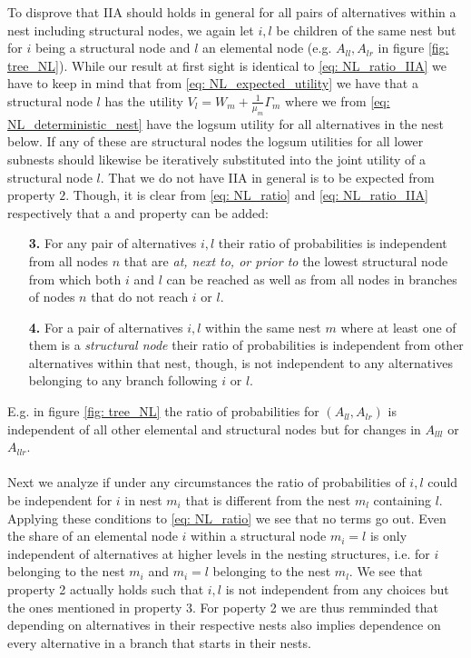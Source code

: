 To disprove that IIA should holds in general for all pairs of alternatives within a nest including structural nodes, we again let $i,l$ be children of the same nest but for $i$ being a structural node and $l$ an elemental node (e.g. $A_{ll},A_{lr}$ in figure \ref{fig: tree_NL}). While our result at first sight is identical to \eqref{eq: NL_ratio_IIA} we have to keep in mind that from \eqref{eq: NL_expected_utility} we have that a structural node $l$ has the utility $V_l=W_m+\frac{1}{\mu_m}\Gamma_{m}$
where we from \eqref{eq: NL_deterministic_nest} have the logsum utility  for all alternatives in the nest below. If any of these are structural nodes the logsum utilities for all lower subnests should likewise be iteratively substituted into the joint utility of a structural node $l$. That we do not have IIA in general is to be expected from property $2$. Though, it is clear from \eqref{eq: NL_ratio} and \eqref{eq: NL_ratio_IIA} respectively that a  and  property can be added:
\begin{itemize}
  \item[\textbf{3.}] For any pair of alternatives $i,l$ their ratio of probabilities is independent from all nodes $n$ that are \textit{at, next to, or prior to} the lowest structural node from which both $i$ and $l$ can be reached as well as from all nodes in branches of nodes $n$ that do not reach $i$ or $l$.
  \item[\textbf{4.}] For a pair of alternatives $i,l$ within the same nest $m$ where at least one of them is a \textit{structural node} their ratio of probabilities is independent from other alternatives within that nest, though, is not independent to any alternatives belonging to any branch following $i$ or $l$.
\end{itemize}
E.g. in figure \ref{fig: tree_NL} the ratio of probabilities for $(A_{ll},A_{lr})$ is independent of all other elemental and structural nodes but for changes in $A_{lll}$ or $A_{llr}$.
\\ \\
Next we analyze if under any circumstances the ratio of probabilities of $i,l$ could be independent for $i$ in nest $m_i$ that is different from the nest $m_l$ containing $l$. Applying these conditions to \eqref{eq: NL_ratio} we see that no terms go out. Even the share of an elemental node $i$ within a structural node $m_i=l$ is only independent of alternatives at higher levels in the nesting structures, i.e. for $i$ belonging to the nest $m_i$ and $m_i=l$ belonging to the nest $m_l$. We see that property 2 actually holds such that $i,l$ is not independent from any choices but the ones mentioned in property 3. For poperty 2 we are thus remminded that depending on alternatives in their respective nests also implies dependence on every alternative in a branch that starts in their nests.
